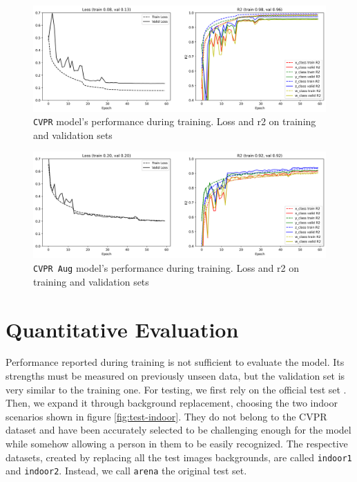 \begin{figure}[H]
	\centering
	\includegraphics[width=1 \textwidth]{"contents/images/06-training-CVPR"}
	\caption[\texttt{CVPR} model's performance during training. Loss and \gls{r2} on training and validation sets]{\texttt{CVPR} model's performance during training. Loss and \gls{r2} on training and validation sets}
	\label{fig:training-metrics-cvpr}
\end{figure}

\begin{figure}[H]
	\centering
	\includegraphics[width=1 \textwidth]{"contents/images/06-training-CVPRaug"}
	\caption[\texttt{CVPR Aug} model's performance during training. Loss and \gls{r2} on training and validation sets]{\texttt{CVPR Aug} model's performance during training. Loss and \gls{r2} on training and validation sets}
	\label{fig:training-metrics-cvpraug}
\end{figure}




\section{Quantitative Evaluation}
\label{sec:evaluation-quantitative}

Performance reported during training is not sufficient to evaluate the model. Its strengths must be measured on previously unseen data, but the validation set is very similar to the training one. For testing, we first rely on the official test set \cite{mantegazza2019visionbased}. Then, we expand it through background replacement, choosing the two indoor scenarios shown in figure \ref{fig:test-indoor}. They do not belong to the CVPR dataset and have been accurately selected to be challenging enough for the model while somehow allowing a person in them to be easily recognized. The respective datasets, created by replacing all the test images backgrounds, are called \texttt{indoor1} and \texttt{indoor2}. Instead, we call \texttt{arena} the original test set.


